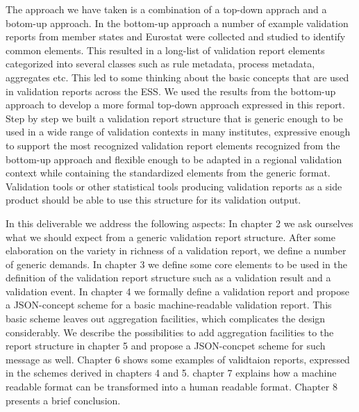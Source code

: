 The approach we have taken is a combination of a top-down apprach and a botom-up approach.
In the bottom-up approach a number of example validation reports from member states and Eurostat were collected and studied to identify common elements.
This resulted in a long-list of validation report elements categorized into several classes such as rule metadata, process metadata, aggregates etc.
This led to some thinking about the basic concepts that are used in validation reports across the ESS.
We used the results from the bottom-up approach to develop a more formal top-down approach expressed in this report.
Step by step we built a validation report structure that is generic enough to be used in a wide range of validation contexts in many institutes,
expressive enough to support the most recognized validation report elements recognized from the bottom-up approach and
flexible enough to be adapted in a regional validation context while containing the standardized elements from the generic format.
Validation tools or other statistical tools producing validation reports as a side product should be able to use this structure for its validation output.

In this deliverable we address the following aspects:
In chapter 2 we ask ourselves what we should expect from a generic validation report structure.
After some elaboration on the variety in richness of a validation report, we define a number of generic demands.
In chapter 3 we define some core elements to be used in the definition of the validation report structure such as a validation result and a validation event.
In chapter 4 we formally define a validation report and propose a JSON-concept scheme for a basic machine-readable validation report.
This basic scheme leaves out aggregation facilities, which complicates the design considerably.
We describe the possibilities to add aggregation facilities to the report structure in chapter 5 and propose a JSON-concpet scheme for such message as well.
Chapter 6 shows some examples of validtaion reports, expressed in the schemes derived in chapters 4 and 5.
chapter 7 explains how a machine readable format can be transformed into a human readable format.
Chapter 8 presents a brief conclusion.

